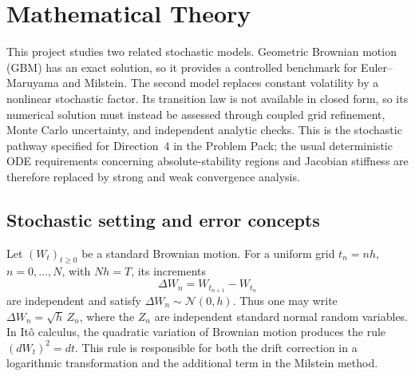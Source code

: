 
\section{Mathematical Theory}
\label{sec:mathematical-theory}

This project studies two related stochastic models.  Geometric Brownian
motion (GBM) has an exact solution, so it provides a controlled benchmark for
Euler--Maruyama and Milstein.  The second model replaces constant volatility by
a nonlinear stochastic factor.  Its transition law is not available in closed
form, so its numerical solution must instead be assessed through coupled grid
refinement, Monte Carlo uncertainty, and independent analytic checks.  This is
the stochastic pathway specified for Direction~4 in the Problem Pack; the
usual deterministic ODE requirements concerning absolute-stability regions
and Jacobian stiffness are therefore replaced by strong and weak convergence
analysis.

\subsection{Stochastic setting and error concepts}
\label{subsec:stochastic-setting}

Let $(W_t)_{t\geq 0}$ be a standard Brownian motion.  For a uniform grid
$t_n=nh$, $n=0,\ldots,N$, with $Nh=T$, its increments
\[
    \Delta W_n=W_{t_{n+1}}-W_{t_n}
\]
are independent and satisfy $\Delta W_n\sim\mathcal{N}(0,h)$.  Thus one may
write $\Delta W_n=\sqrt{h}\,Z_n$, where the $Z_n$ are independent standard
normal random variables.  In It\^o calculus, the quadratic variation of
Brownian motion produces the rule $(dW_t)^2=dt$.  This rule is responsible for
both the drift correction in a logarithmic transformation and the additional
term in the Milstein method.

